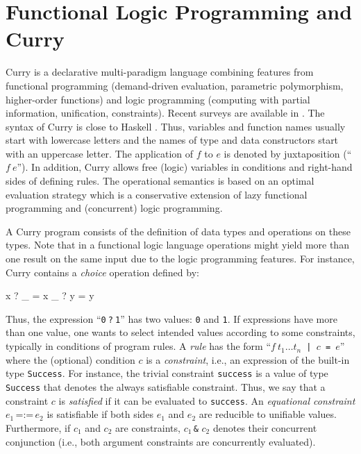 \documentclass[english]{lni}
\newcommand{\code}[1]{\texttt{#1}}
\newcommand{\ccode}[1]{``\code{#1}''}
\begin{document}
\section{Functional Logic Programming and Curry}

Curry \cite{Hanus06Curry}
is a declarative multi-paradigm language combining features 
from functional programming (demand-driven evaluation, parametric
polymorphism, higher-order functions) and logic programming
(computing with partial information, unification, constraints).
Recent surveys are available in \cite{AntoyHanus10CACM,Hanus07ICLP}.
The syntax of Curry is close to Haskell \cite{PeytonJones03Haskell}.
Thus, variables and function names usually
start with lowercase letters and the names of type and data constructors
start with an uppercase letter. The application of $f$
to $e$ is denoted by juxtaposition (``$f~e$'').
In addition, Curry allows free (logic) 
variables in conditions and right-hand sides of defining rules.
The operational semantics is based on an optimal evaluation strategy
\cite{AntoyEchahedHanus00JACM} which is a conservative extension
of lazy functional programming and (concurrent) logic programming.

A Curry program consists of the definition of data types and
operations on these types. 
Note that in a functional logic language
operations might yield more than one result on the same input due to 
the logic programming features.
For instance, Curry contains a \emph{choice} operation defined by:
%
\begin{curry}
  x ? _ = x
  _ ? y = y
\end{curry}
%
Thus, the expression \ccode{0$~$?$~$1} has two values: \code{0} and \code{1}.
If expressions have more than one value, one wants to select
intended values according to some constraints,
typically in conditions of program rules.
A \emph{rule} has the form \ccode{$f~t_1\ldots{}t_n$ | $c$ = $e$}
where the (optional) condition $c$ is a \emph{constraint},
i.e., an expression of the built-in type
\code{Success}. For instance, the trivial constraint
\code{success} is a value of type \code{Success} that
denotes the always satisfiable constraint.
Thus, we say that a constraint $c$ is \emph{satisfied} if it
can be evaluated to \code{success}.
An \emph{equational constraint} $e_1 \,\code{=:=}\, e_2$ is satisfiable
if both sides $e_1$ and $e_2$ are reducible to unifiable values.
Furthermore, if $c_1$ and $c_2$ are constraints,
\code{$c_1\,$\&$\,\,c_2$} denotes their concurrent conjunction
(i.e., both argument constraints are concurrently evaluated).
\end{document}
